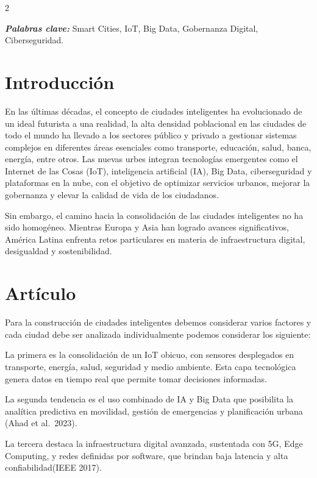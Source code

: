 \documentclass[12pt,spanish,Letterpaper,openany]{book}
\begin{document}
\begin {multicols}{2}

\textbf{\emph{Palabras clave:}} Smart Cities, IoT, Big Data, Gobernanza Digital, Ciberseguridad.

\section{Introducción}\label{introducciuxf3n-3}

En las últimas décadas, el concepto de ciudades inteligentes ha evolucionado de un ideal futurista a una realidad, la alta densidad poblacional en las ciudades de todo el mundo ha llevado a los sectores público y privado a gestionar sistemas complejos en diferentes áreas esenciales como transporte, educación, salud, banca, energía, entre otros. Las nuevas urbes integran tecnologías emergentes como el Internet de las Cosas (IoT), inteligencia artificial (IA), Big Data, ciberseguridad y plataformas en la nube, con el objetivo de optimizar servicios urbanos, mejorar la gobernanza y elevar la calidad de vida de los ciudadanos.

Sin embargo, el camino hacia la consolidación de las ciudades inteligentes no ha sido homogéneo. Mientras Europa y Asia han logrado avances significativos, América Latina enfrenta retos particulares en materia de infraestructura digital, desigualdad y sostenibilidad.

\section{Artículo}\label{artuxedculo-3}

\bigskip

Para la construcción de ciudades inteligentes debemos considerar varios factores y cada ciudad debe ser analizada individualmente podemos considerar los siguiente:

La primera es la consolidación de un IoT obicuo, con sensores desplegados en transporte, energía, salud, seguridad y medio ambiente. Esta capa tecnológica genera datos en tiempo real que permite tomar decisiones informadas.

La segunda tendencia es el uso combinado de IA y Big Data que posibilita la analítica predictiva en movilidad, gestión de emergencias y planificación urbana (Ahad et al.~2023).

La tercera destaca la infraestructura digital avanzada, sustentada con 5G, Edge Computing, y redes definidas por software, que brindan baja latencia y alta confiabilidad(IEEE 2017).


\end{multicols}
\end{document}

